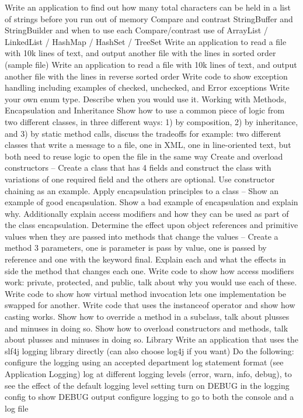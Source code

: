 \documentclass[fleqn,10pt]{SelfArx} %
\begin{document}
Write an application to find out how many total characters can be held in a list of strings before you run out of memory
Compare and contrast StringBuffer and StringBuilder and when to use each
Compare/contrast use of ArrayList / LinkedList / HashMap / HashSet / TreeSet
Write an application to read a file with 10k lines of text, and output another file with the lines in sorted order (sample file)
Write an application to read a file with 10k lines of text, and output another file with the lines in reverse sorted order
Write code to show exception handling including examples of checked, unchecked, and Error exceptions
Write your own enum type.  Describe when you would use it.
Working with Methods, Encapsulation and Inheritance
Show how to use a common piece of logic from two different classes, in three different ways: 1) by composition, 2) by inheritance, and 3) by static method calls, discuss the tradeoffs
for example: two different classes that write a message to a file, one in XML, one in line-oriented text, but both need to reuse logic to open the file in the same way
Create and overload constructors -- Create a class that has 4 fields and construct the class with variations of one required field and the others are optional.  Use constructor chaining as an example.
Apply encapsulation principles to a class -- Show an example of good encapsulation.  Show a bad example of encapsulation and explain why.  Additionally explain access modifiers and how they can be used as part of the class encapsulation.
Determine the effect upon object references and primitive values when they are passed  into methods that change the values -- Create a method 3 parameters, one is parameter is pass by value, one is passed by reference and one with the keyword final.  Explain each and what the effects in side the method that changes each one.
Write code to show how access modifiers work: private, protected, and public, talk about why you would use each of these.
Write code to show how virtual method invocation lets one implementation be swapped for another.
Write code that uses the instanceof operator and show how casting works.
Show how to override a method in a subclass, talk about plusses and minuses in doing so.
Show how to overload constructors and methods, talk about plusses and minuses in doing so.
Library
Write an application that uses the slf4j logging library directly (can also choose log4j if you want)
Do the following:
configure the logging using an accepted department log statement format (see Application Logging)
log at different logging levels (error, warn, info, debug), to see the effect of the default logging level setting
turn on DEBUG in the logging config to show DEBUG output
configure logging to go to both the console and a log file

\end{document}

